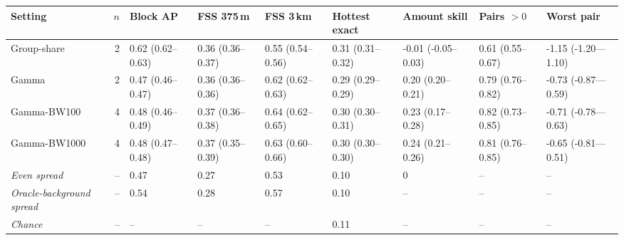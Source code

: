 \begin{tabular}{lrlllllll}
\toprule
Setting & $n$ & Block AP & FSS 375\,m & FSS 3\,km & Hottest exact & Amount skill & Pairs $>0$ & Worst pair \\
\midrule
Group-share & 2 & 0.62 (0.62--0.63) & 0.36 (0.36--0.37) & 0.55 (0.54--0.56) & 0.31 (0.31--0.32) & -0.01 (-0.05--0.03) & 0.61 (0.55--0.67) & -1.15 (-1.20---1.10) \\
Gamma & 2 & 0.47 (0.46--0.47) & 0.36 (0.36--0.36) & 0.62 (0.62--0.63) & 0.29 (0.29--0.29) & 0.20 (0.20--0.21) & 0.79 (0.76--0.82) & -0.73 (-0.87---0.59) \\
Gamma-BW100 & 4 & 0.48 (0.46--0.49) & 0.37 (0.36--0.38) & 0.64 (0.62--0.65) & 0.30 (0.30--0.31) & 0.23 (0.17--0.28) & 0.82 (0.73--0.85) & -0.71 (-0.78---0.63) \\
Gamma-BW1000 & 4 & 0.48 (0.47--0.48) & 0.37 (0.35--0.39) & 0.63 (0.60--0.66) & 0.30 (0.30--0.30) & 0.24 (0.21--0.26) & 0.81 (0.76--0.85) & -0.65 (-0.81---0.51) \\
\midrule
\emph{Even spread} & -- & 0.47 & 0.27 & 0.53 & 0.10 & 0 & -- & -- \\
\emph{Oracle-background spread} & -- & 0.54 & 0.28 & 0.57 & 0.10 & -- & -- & -- \\
\emph{Chance} & -- & -- & -- & -- & 0.11 & -- & -- & -- \\
\bottomrule
\end{tabular}
